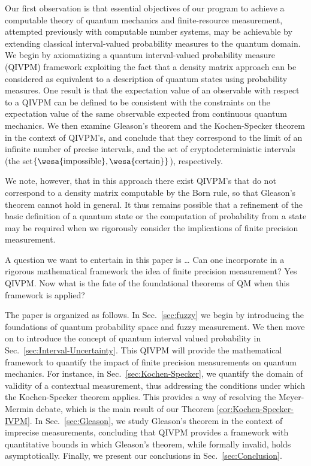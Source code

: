 \documentclass[english,reprint, aps, prl,superscriptaddress, showpacs,
showkeys, longbibliography, amsmath, amssymb]{revtex4-1}
\theoremstyle{plain}
\theoremstyle{definition}
\newcommand{\imposs}{{\text{\wesa{impossible}}}}
\newcommand{\necess}{{\text{\wesa{certain}}}}
\newcommand{\nb}{\nolinebreak[1] }
\begin{document}
Our first observation is that essential objectives of our program to
achieve a computable theory of quantum mechanics and finite-resource
measurement, attempted previously with computable number
systems\nb\cite{usat,geometry2013apsrev4,DQT2014}, may be achievable by
extending classical interval-valued probability
measures\nb\cite{JamisonLodwick2004} to the quantum domain.  We begin by axiomatizing a quantum interval-valued probability measure (QIVPM)
framework exploiting the fact that a density matrix approach can be
considered as equivalent to a description of quantum states using
probability measures\nb\cite{10.2307/2308516,Varadarajan2008}. %
One result is that the expectation value of an observable with respect
to a QIVPM can be defined to be consistent with the constraints on the
expectation value of the same observable expected from continuous
quantum mechanics.  We then examine Gleason's
theorem\nb\cite{gleason1957,Redhead1987-REDINA,peres1995quantum} and the
Kochen-Specker theorem in the context of QIVPM's, and conclude that
they correspond to the limit of an infinite number of precise
intervals, and the set of cryptodeterministic intervals (the set\nb$\{\imposs,\necess\}$),
respectively.

We note, however, that in this approach there exist QIVPM's that do
not correspond to a density matrix computable by the Born rule, so
that Gleason's theorem cannot hold in general.  It thus remains
possible that a refinement of the basic definition of a quantum state
or the computation of probability from a state may be required when we
rigorously consider the implications of finite precision measurement.

A question we want to entertain in this paper is \ldots
Can one incorporate in a rigorous mathematical framework the idea of
finite precision measurement? Yes QIVPM. Now what is the fate of the 
foundational theorems of QM when this framework is applied?

The paper is organized as follows.   In Sec.\ \ref{sec:fuzzy} we begin by introducing the foundations of quantum probability space and fuzzy measurement.  We then move on to introduce the concept of quantum interval valued probability in Sec.\ \ref{sec:Interval-Uncertainty}.  This QIVPM will provide the mathematical framework to quantify the impact of finite precision measurements on quantum mechanics.  For instance, in Sec.\ \ref{sec:Kochen-Specker},  we quantify the domain of validity of a  contextual measurement, thus addressing the conditions under which the Kochen-Specker theorem applies.  This provides a way of resolving the Meyer-Mermin debate, which is the main result of our Theorem \ref{cor:Kochen-Specker-IVPM}.  In Sec.\ \ref{sec:Gleason}, we study Gleason's theorem in the context of imprecise measurements, concluding that QIVPM provides a framework with quantitative bounds in which Gleason's theorem, while formally invalid, holds asymptotically.  Finally, we present our conclusions in Sec.~\ref{sec:Conclusion}.
\end{document}
